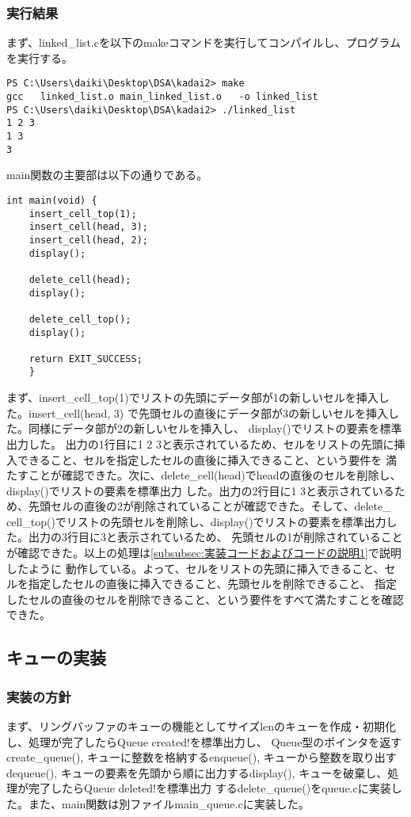 \documentclass{ltjsarticle}
\begin{document}
\subsubsection{実行結果}\label{subsubsec:実行結果1}
まず、linked\_list.cを以下のmakeコマンドを実行してコンパイルし、プログラムを実行する。
\begin{lstlisting}
PS C:\Users\daiki\Desktop\DSA\kadai2> make
gcc   linked_list.o main_linked_list.o   -o linked_list
PS C:\Users\daiki\Desktop\DSA\kadai2> ./linked_list
1 2 3 
1 3
3  
\end{lstlisting}
main関数の主要部は以下の通りである。
\begin{lstlisting}
int main(void) {
    insert_cell_top(1);
    insert_cell(head, 3);
    insert_cell(head, 2);
    display();
    
    delete_cell(head);
    display();
    
    delete_cell_top();
    display();
    
    return EXIT_SUCCESS;
    }    
\end{lstlisting}
まず、insert\_cell\_top(1)でリストの先頭にデータ部が1の新しいセルを挿入した。insert\_cell(head, 3)
で先頭セルの直後にデータ部が3の新しいセルを挿入した。同様にデータ部が2の新しいセルを挿入し、
display()でリストの要素を標準出力した。
出力の1行目に1 2 3と表示されているため、セルをリストの先頭に挿入できること、セルを指定したセルの直後に挿入できること、という要件を
満たすことが確認できた。次に、delete\_cell(head)でheadの直後のセルを削除し、display()でリストの要素を標準出力
した。出力の2行目に1 3と表示されているため、先頭セルの直後の2が削除されていることが確認できた。そして、delete\_
cell\_top()でリストの先頭セルを削除し、display()でリストの要素を標準出力した。出力の3行目に3と表示されているため、
先頭セルの1が削除されていることが確認できた。以上の処理は\ref{subsubsec:実装コードおよびコードの説明1}で説明したように
動作している。よって、セルをリストの先頭に挿入できること、セルを指定したセルの直後に挿入できること、先頭セルを削除できること、
指定したセルの直後のセルを削除できること、という要件をすべて満たすことを確認できた。
\subsection{キューの実装}
\subsubsection{実装の方針}\label{subsubsec:実装の方針2}
まず、リングバッファのキューの機能としてサイズlenのキューを作成・初期化し、処理が完了したらQueue created!を標準出力し、
Queue型のポインタを返すcreate\_queue(), キューに整数を格納するenqueue(), キューから整数を取り出す
dequeue(), キューの要素を先頭から順に出力するdisplay(), キューを破棄し、処理が完了したらQueue deleted!を標準出力
するdelete\_queue()をqueue.cに実装した。また、main関数は別ファイルmain\_queue.cに実装した。
\end{document}
